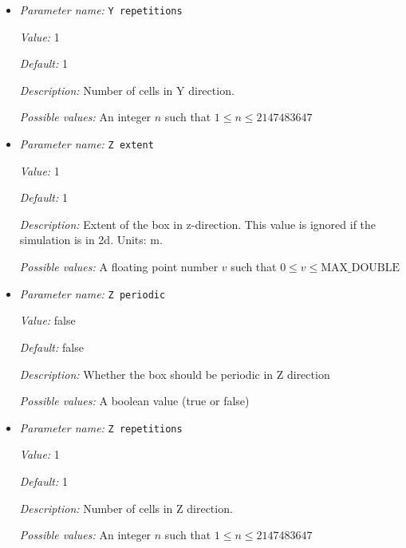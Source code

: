 \begin{itemize}
{\it Default:} false


{\it Description:} Whether the box should be periodic in Y direction


{\it Possible values:} A boolean value (true or false)
\item {\it Parameter name:} {\tt Y repetitions}
\label{parameters:Geometry model/Box/Y repetitions}
\label{parameters:Geometry_20model/Box/Y_20repetitions}


{\it Value:} 1


{\it Default:} 1


{\it Description:} Number of cells in Y direction.


{\it Possible values:} An integer $n$ such that $1\leq n \leq 2147483647$
\item {\it Parameter name:} {\tt Z extent}
\label{parameters:Geometry model/Box/Z extent}
\label{parameters:Geometry_20model/Box/Z_20extent}


{\it Value:} 1


{\it Default:} 1


{\it Description:} Extent of the box in z-direction. This value is ignored if the simulation is in 2d. Units: m.


{\it Possible values:} A floating point number $v$ such that $0 \leq v \leq \text{MAX\_DOUBLE}$
\item {\it Parameter name:} {\tt Z periodic}
\label{parameters:Geometry model/Box/Z periodic}
\label{parameters:Geometry_20model/Box/Z_20periodic}


{\it Value:} false


{\it Default:} false


{\it Description:} Whether the box should be periodic in Z direction


{\it Possible values:} A boolean value (true or false)
\item {\it Parameter name:} {\tt Z repetitions}
\label{parameters:Geometry model/Box/Z repetitions}
\label{parameters:Geometry_20model/Box/Z_20repetitions}


{\it Value:} 1


{\it Default:} 1


{\it Description:} Number of cells in Z direction.


{\it Possible values:} An integer $n$ such that $1\leq n \leq 2147483647$
\end{itemize}

